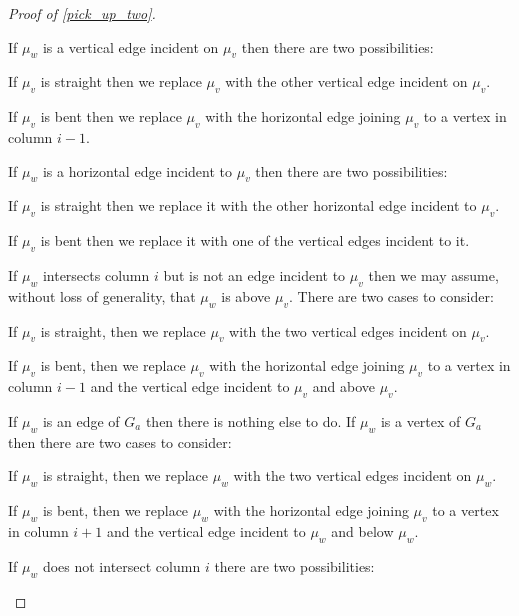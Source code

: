\documentclass{patmorin}
\begin{document}
\begin{proof}[Proof of \cref{pick_up_two}]
  \begin{compactenum}
    \item If $\mu_w$ is a vertical edge incident on $\mu_v$ then there are two possibilities:
    \begin{compactitem}
      \item If $\mu_v$ is straight then we replace $\mu_v$ with the other vertical edge incident on $\mu_v$.
      \item If $\mu_v$ is bent then we replace $\mu_v$ with the horizontal edge joining $\mu_v$ to a vertex in column $i-1$.
    \end{compactitem}
    \item If  $\mu_w$ is a horizontal edge incident to $\mu_v$ then there are two possibilities:
    \begin{compactitem}
      \item If $\mu_v$ is straight then we replace it with the other horizontal edge incident to $\mu_v$.
      \item If $\mu_v$ is bent then we replace it with one of the vertical edges incident to it.
    \end{compactitem}
    \item If $\mu_w$ intersects column $i$ but is not an edge incident to $\mu_v$ then we may assume, without loss of generality, that $\mu_w$ is above $\mu_v$.  There are two cases to consider:
    \begin{compactitem}
      \item If $\mu_v$ is straight, then we replace $\mu_v$ with the two vertical edges incident on $\mu_v$.
      \item If $\mu_v$ is bent, then we replace $\mu_v$ with the horizontal edge joining $\mu_v$ to a vertex in column $i-1$ and the vertical edge incident to $\mu_v$ and above $\mu_v$.
    \end{compactitem}
    If $\mu_w$ is an edge of $G_a$ then there is nothing else to do. If $\mu_w$ is a vertex of $G_a$ then there are two cases to consider:
    \begin{compactitem}
      \item If $\mu_w$ is straight, then we replace $\mu_w$ with the two vertical edges incident on $\mu_w$.
      \item If $\mu_w$ is bent, then we replace $\mu_w$ with the horizontal edge joining $\mu_v$ to a vertex in column $i+1$ and the vertical edge incident to $\mu_w$ and below $\mu_w$.
    \end{compactitem}
    \item If $\mu_w$ does not intersect column $i$ there are two possibilities:

\end{compactenum}
\end{proof}
\end{document}
